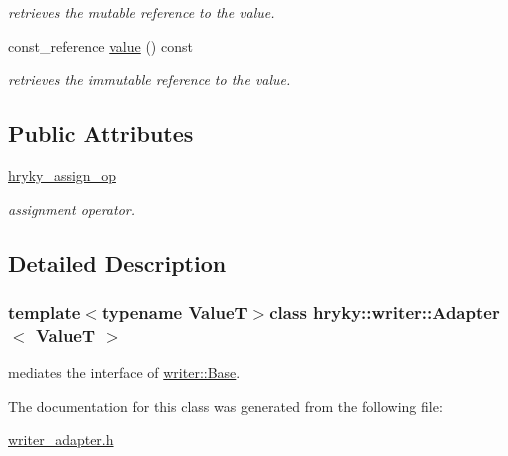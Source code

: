 \begin{DoxyCompactItemize}
\begin{DoxyCompactList}\small\item\em retrieves the mutable reference to the value. \end{DoxyCompactList}\item 
\hypertarget{classhryky_1_1_adapter_a5856f2ee6c0622e153f52fbb6ca6bbe9}{const\-\_\-reference \hyperlink{classhryky_1_1_adapter_a5856f2ee6c0622e153f52fbb6ca6bbe9}{value} () const}\label{classhryky_1_1_adapter_a5856f2ee6c0622e153f52fbb6ca6bbe9}

\begin{DoxyCompactList}\small\item\em retrieves the immutable reference to the value. \end{DoxyCompactList}\end{DoxyCompactItemize}
\subsection*{Public Attributes}
\begin{DoxyCompactItemize}
\item 
\hypertarget{classhryky_1_1_adapter_a764c5fe566545047f3acaf18792e5102}{\hyperlink{classhryky_1_1_adapter_a764c5fe566545047f3acaf18792e5102}{hryky\-\_\-assign\-\_\-op}}\label{classhryky_1_1_adapter_a764c5fe566545047f3acaf18792e5102}

\begin{DoxyCompactList}\small\item\em assignment operator. \end{DoxyCompactList}\end{DoxyCompactItemize}


\subsection{Detailed Description}
\subsubsection*{template$<$typename Value\-T$>$class hryky\-::writer\-::\-Adapter$<$ Value\-T $>$}

mediates the interface of \hyperlink{classhryky_1_1writer_1_1_base}{writer\-::\-Base}. 

The documentation for this class was generated from the following file\-:\begin{DoxyCompactItemize}
\item 
\hyperlink{writer__adapter_8h}{writer\-\_\-adapter.\-h}\end{DoxyCompactItemize}
